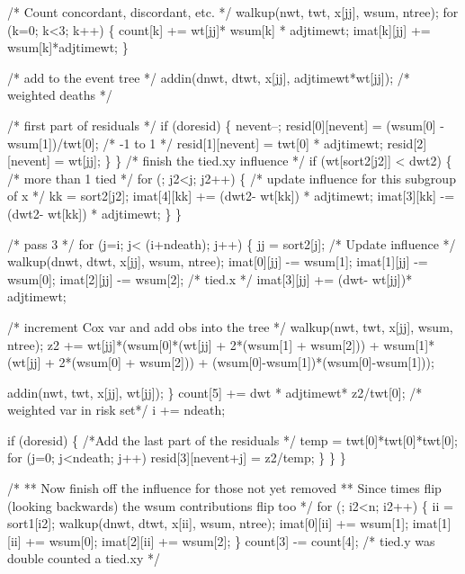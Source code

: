 \documentclass{article}
\begin{document}
\begin{nwchunk}
             /* Count concordant, discordant, etc. */
             walkup(nwt, twt, x[jj], wsum, ntree);
             for (k=0; k<3; k++) \{
                 count[k] += wt[jj]* wsum[k] * adjtimewt;
                 imat[k][jj] += wsum[k]*adjtimewt;
             \}
 
             /* add to the event tree */
             addin(dnwt, dtwt, x[jj], adjtimewt*wt[jj]);  /* weighted deaths */
 
             /* first part of residuals */
             if (doresid) \{
                 nevent--;
                 resid[0][nevent] = (wsum[0] - wsum[1])/twt[0]; /* -1 to 1 */
                 resid[1][nevent] = twt[0] * adjtimewt;
                 resid[2][nevent] = wt[jj];
             \}
         \}
         /* finish the tied.xy influence */
         if (wt[sort2[j2]] < dwt2) \{ /* more than 1 tied */
             for (; j2<j; j2++) \{
                 /* update influence for this subgroup of x */
                 kk = sort2[j2];
                 imat[4][kk] += (dwt2- wt[kk]) * adjtimewt;
                 imat[3][kk] -= (dwt2- wt[kk]) * adjtimewt;
             \}
         \}
 
         /* pass 3 */
         for (j=i; j< (i+ndeath); j++) \{
             jj = sort2[j];
             /* Update influence */
             walkup(dnwt, dtwt, x[jj], wsum, ntree);
             imat[0][jj] -= wsum[1];
             imat[1][jj] -= wsum[0];
             imat[2][jj] -= wsum[2];  /* tied.x */
             imat[3][jj] += (dwt- wt[jj])* adjtimewt;
 
             /* increment Cox var and add obs into the tree */
             walkup(nwt, twt, x[jj], wsum, ntree);
             z2 += wt[jj]*(wsum[0]*(wt[jj] + 2*(wsum[1] + wsum[2])) +
                           wsum[1]*(wt[jj] + 2*(wsum[0] + wsum[2])) +
                           (wsum[0]-wsum[1])*(wsum[0]-wsum[1]));
 
             addin(nwt, twt, x[jj], wt[jj]); 
         \}
         count[5] += dwt * adjtimewt* z2/twt[0]; /* weighted var in risk set*/
         i += ndeath;
 
         if (doresid) \{ /*Add the last part of the residuals */
             temp = twt[0]*twt[0]*twt[0];
             for (j=0; j<ndeath; j++)
                 resid[3][nevent+j] = z2/temp;
         \}
     \}
 \}
 
 /* 
 ** Now finish off the influence for those not yet removed
 **  Since times flip (looking backwards) the wsum contributions flip too
 */
 for (; i2<n; i2++) \{
     ii = sort1[i2];
     walkup(dnwt, dtwt, x[ii], wsum, ntree);
     imat[0][ii] += wsum[1];
     imat[1][ii] += wsum[0];
     imat[2][ii] += wsum[2];
 \}
 count[3] -= count[4]; /* tied.y was double counted a tied.xy */
\end{nwchunk}
\end{document}
